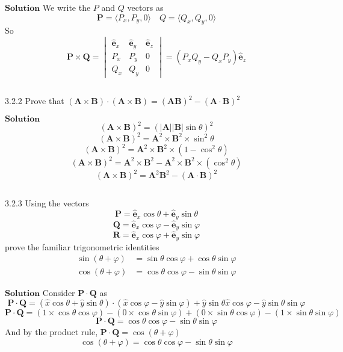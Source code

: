 $\boxed{\textbf{Solution}}$ We write the $P$ and $Q$ vectors as
$$\mathbf{P} = \langle P_x, P_y,0\rangle \quad Q = \langle Q_x, Q_y,0\rangle$$
So
$$\mathbf{P} \times \mathbf{Q} = \begin{vmatrix}
\hat{\mathbf{e}}_{x} & \hat{\mathbf{e}}_{y} & \hat{\mathbf{e}}_{z}\\ 
P_{x} & P_{y} & 0\\ 
Q_{x} & Q_{y} & 0
\end{vmatrix} =  (P_{x} Q_{y} - Q_{x} P_{y})\hat{\mathbf{e}}_{z}$$

$$$$


\begin{mybox}{3.2.2}
Prove that $(\mathbf{A} \times \mathbf{B}) \cdot(\mathbf{A} \times \mathbf{B})=(\mathbf{A} \mathbf{B})^{2}-(\mathbf{A} \cdot \mathbf{B})^{2}$
\end{mybox}


$\boxed{\textbf{Solution}}$
$$(\mathbf{A} \times \mathbf{B})^{2}=(|\mathbf{A}||\mathbf{B}| \sin \theta)^{2}$$
$$(\mathbf{A} \times \mathbf{B})^{2}=\mathbf{A}^{2} \times \mathbf{B}^{2} \times \sin ^{2} \theta$$
$$(\mathbf{A} \times \mathbf{B})^{2}=\mathbf{A}^{2} \times \mathbf{B}^{2} \times\left(1-\cos ^{2} \theta\right)$$
$$(\mathbf{A} \times \mathbf{B})^{2}=\mathbf{A}^{2} \times \mathbf{B}^{2}-\mathbf{A}^{2} \times \mathbf{B}^{2} \times\left(\cos ^{2} \theta\right)$$
$$(\mathbf{A} \times \mathbf{B})^{2}=\mathbf{A}^{2} \mathbf{B}^{2}-(\mathbf{A} \cdot \mathbf{B})^{2}$$

$$$$

\begin{mybox}{3.2.3}
Using the vectors
$$\mathbf{P}=\hat{\mathbf{e}}_{x} \cos \theta+\hat{\mathbf{e}}_{y} \sin \theta$$
$$\mathbf{Q}=\hat{\mathbf{e}}_{x} \cos \varphi-\hat{\mathbf{e}}_{y} \sin \varphi$$
$$\mathbf{R}=\hat{\mathbf{e}}_{x} \cos \varphi+\hat{\mathbf{e}}_{y} \sin \varphi$$
prove the familiar trigonometric identities
$$
\begin{aligned} \sin (\theta+\varphi) &=\sin \theta \cos \varphi+\cos \theta \sin \varphi \\ \cos (\theta+\varphi) &=\cos \theta \cos \varphi-\sin \theta \sin \varphi \end{aligned}
$$
\end{mybox}


$\boxed{\textbf{Solution}}$ Consider $\mathbf{P}\cdot \mathbf{Q}$ as
$$\mathbf{P}\cdot \mathbf{Q} = (\hat{x} \cos \theta+\hat{y} \sin \theta) \cdot\left(\hat{x} \cos \varphi-\hat{y} \sin \varphi\right)+\hat{y} \sin \theta \hat{x} \cos \varphi-\hat{y} \sin \theta \sin \varphi$$
$$\mathbf{P}\cdot \mathbf{Q} = (1 \times \cos \theta \cos \varphi)-(0 \times \cos \theta \sin \varphi)+(0 \times \sin \theta \cos \varphi) - (1\times \sin \theta \sin \varphi)$$
$$\mathbf{P}\cdot \mathbf{Q} = \cos \theta \cos \varphi-\sin \theta \sin \varphi$$
And by the product rule, $\mathbf{P}\cdot \mathbf{Q} = \cos(\theta + \varphi)$
$$\cos (\theta+\varphi)=\cos \theta \cos \varphi-\sin \theta \sin \varphi$$




